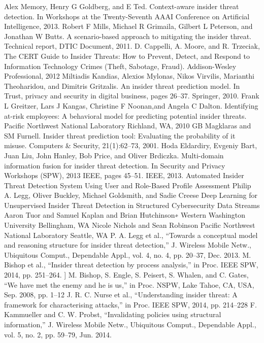 \documentclass[conference]{IEEEtran}
\begin{document}
\begin{thebibliography}{00}
 Alex Memory, Henry G Goldberg, and E Ted. Context-aware insider threat detection. In Workshops at the Twenty-Seventh AAAI Conference on Artificial
Intelligence, 2013.
 Robert F Mills, Michael R Grimaila, Gilbert L Peterson, and Jonathan W Butts. A scenario-based approach to mitigating the insider threat. Technical report, DTIC Document, 2011.
  D. Cappelli, A. Moore, and R. Trzeciak, The CERT Guide to Insider Threats: How to Prevent, Detect, and Respond
to Information Technology Crimes (Theft, Sabotage, Fraud). Addison-Wesley Professional, 2012
  Miltiadis Kandias, Alexios Mylonas, Nikos Virvilis, Marianthi Theoharidou, and Dimitris Gritzalis. An insider threat prediction model. In Trust, privacy and security in digital business, pages 26–37. Springer, 2010.
Frank L Greitzer, Lars J Kangas, Christine F Noonan,and Angela C Dalton. Identifying at-risk employees: A behavioral model for predicting potential insider threats. Pacific Northwest National Laboratory Richland, WA, 2010
GB Magklaras and SM Furnell. Insider threat prediction tool: Evaluating the probability of it misuse. Computers \& Security, 21(1):62–73, 2001.
Hoda Eldardiry, Evgeniy Bart, Juan Liu, John Hanley, Bob Price, and Oliver Brdiczka. Multi-domain information fusion for insider threat detection. In Security and Privacy Workshops (SPW), 2013 IEEE, pages 45–51. IEEE, 2013.
Automated Insider Threat Detection System Using User and Role-Based Profile Assessment Philip A. Legg, Oliver Buckley, Michael Goldsmith, and Sadie Creese
  Deep Learning for Unsupervised Insider Threat Detection in Structured Cybersecurity Data Streams Aaron Tuor and Samuel Kaplan and Brian Hutchinson∗
Western Washington University Bellingham, WA Nicole Nichols and Sean Robinson Pacific Northwest National Laboratory Seattle, WA
  P. A. Legg et al., “Towards a conceptual model and reasoning structure for insider threat detection,” J. Wireless Mobile Netw., Ubiquitous Comput., Dependable Appl., vol. 4, no. 4, pp. 20–37, Dec. 2013.
 M. Bishop et al., “Insider threat detection by process analysis,” in Proc. IEEE SPW, 2014, pp. 251–264.
] M. Bishop, S. Engle, S. Peisert, S. Whalen, and C. Gates, “We have met the enemy and he is us,” in Proc. NSPW, Lake Tahoe, CA, USA, Sep. 2008, pp. 1–12
 J. R. C. Nurse et al., “Understanding insider threat: A framework for characterising attacks,” in Proc. IEEE SPW, 2014, pp. 214–228
F. Kammueller and C. W. Probst, “Invalidating policies using structural information,” J. Wireless Mobile Netw., Ubiquitous Comput., Dependable Appl., vol. 5, no. 2, pp. 59–79, Jun. 2014.

\end{thebibliography}
\end{document}
